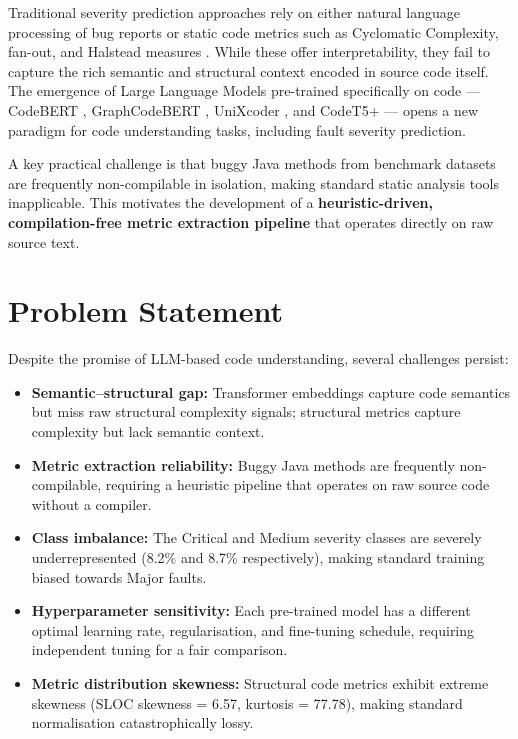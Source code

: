 \documentclass[12pt, a4paper]{report}
\begin{document}
Traditional severity prediction approaches rely on either natural language processing of bug reports \cite{ref1} or static code metrics such as Cyclomatic Complexity, fan-out, and Halstead measures \cite{ref2,mccabe,halstead}. While these offer interpretability, they fail to capture the rich semantic and structural context encoded in source code itself. The emergence of Large Language Models pre-trained specifically on code --- CodeBERT \cite{codebert}, GraphCodeBERT \cite{graphcodebert}, UniXcoder \cite{unixcoder}, and CodeT5+ \cite{codet5p} --- opens a new paradigm for code understanding tasks, including fault severity prediction.

A key practical challenge is that buggy Java methods from benchmark datasets are frequently non-compilable in isolation, making standard static analysis tools inapplicable. This motivates the development of a \textbf{heuristic-driven, compilation-free metric extraction pipeline} that operates directly on raw source text.

\section{Problem Statement}

Despite the promise of LLM-based code understanding, several challenges persist:
\begin{itemize}
  \item \textbf{Semantic--structural gap:} Transformer embeddings capture code semantics but miss raw structural complexity signals; structural metrics capture complexity but lack semantic context.
  \item \textbf{Metric extraction reliability:} Buggy Java methods are frequently non-compilable, requiring a heuristic pipeline that operates on raw source code without a compiler.
  \item \textbf{Class imbalance:} The Critical and Medium severity classes are severely underrepresented (8.2\% and 8.7\% respectively), making standard training biased towards Major faults.
  \item \textbf{Hyperparameter sensitivity:} Each pre-trained model has a different optimal learning rate, regularisation, and fine-tuning schedule, requiring independent tuning for a fair comparison.
  \item \textbf{Metric distribution skewness:} Structural code metrics exhibit extreme skewness (SLOC skewness = 6.57, kurtosis = 77.78), making standard normalisation catastrophically lossy.
\end{itemize}
\end{document}
